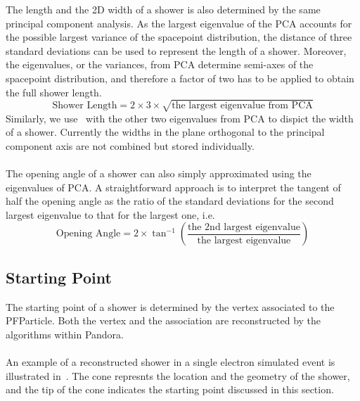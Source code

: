 The length and the 2D width of a shower is also determined by the same
principal component analysis.
As the largest eigenvalue of the PCA accounts for the possible largest
variance of the spacepoint distribution, the distance of three
standard deviations can be used to represent the length of a shower.
Moreover, the eigenvalues, or the variances, from PCA determine semi-axes
of the spacepoint distribution, and therefore a factor of two has to be
applied to obtain the full shower length.
\begin{equation}
\label{eq:shrlength}
\textrm{Shower Length} = 2\times 3\times \sqrt{\textrm{the largest eigenvalue from PCA}}
\end{equation}
Similarly, we use~ with the other two eigenvalues
from PCA to dispict the width of a shower.
Currently the widths in the plane orthogonal to the principal component
axis are not combined but stored individually.\\
\\
The opening angle of a shower can also simply approximated using the
eigenvalues of PCA.
A straightforward approach is to interpret the tangent of half the 
opening angle as the ratio of the standard deviations for the second
largest eigenvalue to that for the largest one, i.e.
\begin{equation}
\label{eq:shropeningangle}
\textrm{Opening Angle} = 2\times \tan^{-1}({\frac{\textrm{the 2nd largest eigenvalue}}{\textrm{the largest eigenvalue}}})
\end{equation}

\subsection{Starting Point}
\label{sec:shr_startingpt}

The starting point of a shower is determined by the vertex associated to
the PFParticle.
Both the vertex and the association are reconstructed by the algorithms
within Pandora.\\
\\
An example of a reconstructed shower in a single electron simulated event
is illustrated in~.
The cone represnts the location and the geometry of the shower, and
the tip of the cone indicates the starting point discussed in this section.

